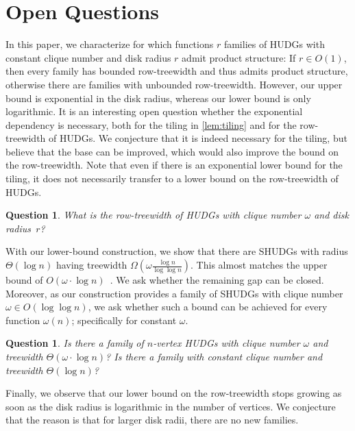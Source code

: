 \documentclass[11pt]{article}
\newtheorem{question}[theorem]{Question}
\providecommand{\todo}[2][]{}
\begin{document}
\section{Open Questions}\label{sec:open}
%
In this paper, we characterize for which functions $ r $ families of HUDGs with constant clique number and disk radius $ r $ admit product structure:
If $ r \in O(1) $, then every family has bounded row-treewidth and thus admits product structure, otherwise there are families with unbounded row-treewidth.
However, our upper bound is exponential in the disk radius, whereas our lower bound is only logarithmic. 
It is an interesting open question whether the exponential dependency is necessary, both for the tiling in \cref{lem:tiling} and for the row-treewidth of HUDGs.
We conjecture that it is indeed necessary for the tiling, but believe that the base can be improved, which would also improve the bound on the row-treewidth.
Note that even if there is an exponential lower bound for the tiling, it does not necessarily transfer to a lower bound on the row-treewidth of HUDGs.
%
\begin{question}
    What is the row-treewidth of HUDGs with clique number $ \omega $ and disk radius~$ r $?
\end{question}
%
With our lower-bound construction, we show that there are SHUDGs with radius $ \Theta(\log n) $ having treewidth $ \Omega( \omega \frac{\log n}{\log \log n} ) $.
This almost matches the upper bound of $ O(\omega \cdot \log n) $~\cite{Struc_Indep_Hyper_Unifor_Disk_Graph-Blaesius25,Treew_Graph_Balan_Separ-DvoraNorin19}.
We ask whether the remaining gap can be closed.
Moreover, as our construction provides a family of SHUDGs with clique number $\omega \in O(\log \log n)$, we ask whether such a bound can be achieved for every function $\omega(n)$; specifically for constant $\omega$.
%
\begin{question}
    Is there a family of $ n $-vertex HUDGs with clique number $ \omega $ and treewidth $ \Theta(\omega \cdot \log n) $?
    Is there a family with constant clique number and treewidth $\Theta(\log n)$?
\end{question}
%
Finally, we observe that our lower bound on the row-treewidth stops growing as soon as the disk radius is logarithmic in the number of vertices.
We conjecture that the reason is that for larger disk radii, there are no new families.
%
\todo[inline]{this only make sense for constant clique number: for $ \omega(n) = \log \log n $, of course, the row-treewidth stops increasing as it is upper-bounded by the treewidth. We maybe should discuss this somewhere.}
\end{document}

